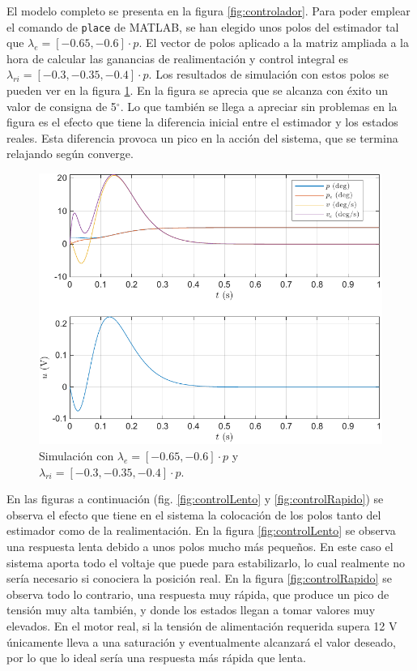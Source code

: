 \documentclass{article}
\newcommand{\degree}[0]{^{\circ}}
\newcommand{\code}[1]{\colorbox{light-gray}{\texttt{#1}}}
\begin{document}
El modelo completo se presenta en la figura \ref{fig:controlador}. Para poder emplear el comando de \code{place} de MATLAB, se han elegido unos polos del estimador tal que $\lambda_e = \left[ -0.65, -0.6 \right]\cdot p$. El vector de polos aplicado a la matriz ampliada a la hora de calcular las ganancias de realimentación y control integral es $\lambda_{ri} = \left[ -0.3, -0.35, -0.4 \right]\cdot p$. Los resultados de simulación con estos polos se pueden ver en la figura \ref{fig:controlJusto}. En la figura se aprecia que se alcanza con éxito un valor de consigna de 5$\degree$. Lo que también se llega a apreciar sin problemas en la figura es el efecto que tiene la diferencia inicial entre el estimador y los estados reales. Esta diferencia provoca un pico en la acción del sistema, que se termina relajando según converge.

\begin{figure}[H]
    \centering
    \includegraphics[width=0.75\linewidth]{img/controlJusto.pdf}
    \caption{Simulación con $\lambda_e = \left[ -0.65, -0.6 \right]\cdot p$ y $\lambda_{ri} = \left[ -0.3, -0.35, -0.4 \right]\cdot p$.}
    \label{fig:controlJusto}
\end{figure}

En las figuras a continuación (fig. \ref{fig:controlLento} y \ref{fig:controlRapido}) se observa el efecto que tiene en el sistema la colocación de los polos tanto del estimador como de la realimentación. En la figura \ref{fig:controlLento} se observa una respuesta lenta debido a unos polos mucho más pequeños. En este caso el sistema aporta todo el voltaje que puede para estabilizarlo, lo cual realmente no sería necesario si conociera la posición real. En la figura \ref{fig:controlRapido} se observa todo lo contrario, una respuesta muy rápida, que produce un pico de tensión muy alta también, y donde los estados llegan a tomar valores muy elevados. En el motor real, si la tensión de alimentación requerida supera 12 V únicamente lleva a una saturación y eventualmente alcanzará el valor deseado, por lo que lo ideal sería una respuesta más rápida que lenta.
\end{document}
